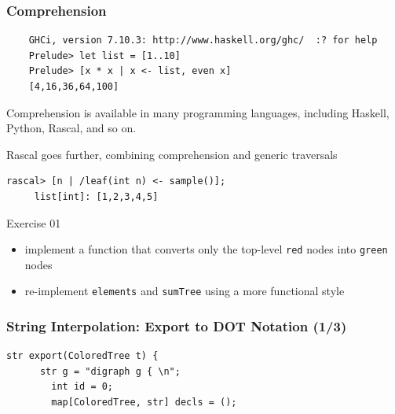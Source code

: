 \documentclass{beamer}
\begin{document}
\begin{frame}
\end{frame}

\begin{frame}[fragile]
  \frametitle{Comprehension}

  \begin{small}
  \begin{verbatim}
    GHCi, version 7.10.3: http://www.haskell.org/ghc/  :? for help
    Prelude> let list = [1..10]
    Prelude> [x * x | x <- list, even x]
    [4,16,36,64,100]    
  \end{verbatim}\end{small} \pause
  
  Comprehension is available in many programming languages\pause,
  including Haskell, Python, Rascal, and so on. \pause 

  \begin{block}{Rascal goes further, combining comprehension and generic traversals}
   \begin{lstlisting}[language=Rascal]
     rascal> [n | /leaf(int n) <- sample()];
     list[int]: [1,2,3,4,5]
   \end{lstlisting}
  \end{block}
  
\end{frame}

\begin{frame}
  \begin{block}{Exercise 01}
    \begin{itemize}
      \item implement a function that converts only the top-level \texttt{red} nodes into \texttt{green} nodes
        \item re-implement \texttt{elements} and \texttt{sumTree} using a more {\color{blue}functional style}   
    \end{itemize}
  \end{block}  
\end{frame}
\begin{frame}[fragile]
  \frametitle{String Interpolation: Export to DOT Notation (1/3)}

    \begin{lstlisting}[language=Rascal]
    str export(ColoredTree t) {
      str g = "digraph g { \n";
        int id = 0;
        map[ColoredTree, str] decls = ();
\end{lstlisting}

\end{frame}
\end{document}
